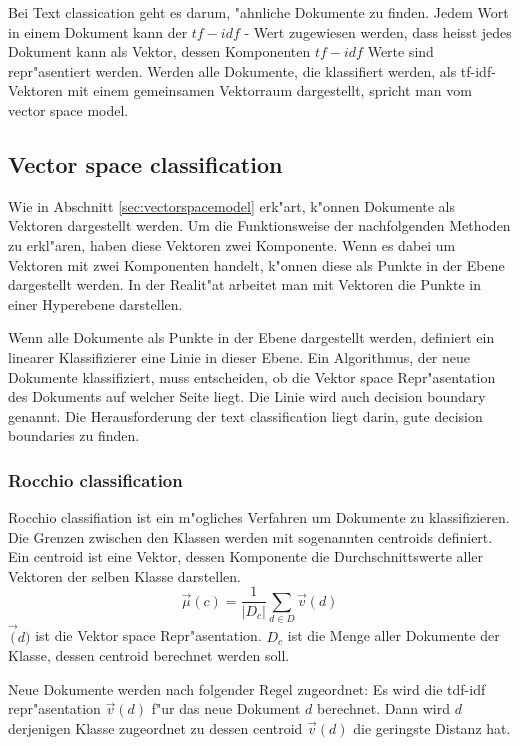 \documentclass[12pt,a4paper,twoside]{article}
\begin{document}
Bei Text classication geht es darum, "ahnliche Dokumente zu finden. Jedem Wort in einem Dokument kann der $tf-idf$ - Wert zugewiesen werden, dass heisst jedes Dokument kann als Vektor, dessen Komponenten $tf-idf$ Werte sind repr"asentiert werden. Werden alle Dokumente, die klassifiert werden, als tf-idf-Vektoren mit einem gemeinsamen Vektorraum dargestellt, spricht man vom vector space model.

\subsection{Vector space classification}
\label{sec:vectorclassification}

Wie in Abschnitt \ref{sec:vectorspacemodel} erk"art, k"onnen Dokumente als Vektoren dargestellt werden. Um die Funktionsweise der nachfolgenden Methoden zu erkl"aren, haben diese Vektoren zwei Komponente. Wenn es dabei um Vektoren mit zwei Komponenten handelt, k"onnen diese als Punkte in der Ebene dargestellt werden. In der Realit"at arbeitet man mit Vektoren die Punkte in einer Hyperebene darstellen.

Wenn alle Dokumente als Punkte in der Ebene dargestellt werden, de\-finiert ein linearer Klassifizierer eine Linie in dieser Ebene. Ein Algorithmus, der neue Dokumente klassifiziert, muss entscheiden, ob die Vektor space Repr"a\-sentation des Dokuments auf welcher Seite liegt. Die Linie wird auch decision boundary genannt. Die Herausforderung der text classification liegt darin, gute decision boundaries zu finden.


\subsubsection{Rocchio classification}
\label{sec:rocchio}

Rocchio classifiation ist ein m"ogliches Verfahren um Dokumente zu klassifizieren. Die Grenzen zwischen den Klassen werden mit sogenannten centroids definiert. Ein centroid ist eine Vektor, dessen Komponente die Durchschnitts\-werte aller Vektoren der selben Klasse darstellen.
\[
\vec \mu(c) = \frac{1}{|D_c|} \sum_{d \in D} \vec v (d)
\]
$\vec (d)$ ist die Vektor space Repr"asentation. $D_c$ ist die Menge aller Dokumente der Klasse, dessen centroid berechnet werden soll.

Neue Dokumente werden nach folgender Regel zugeordnet: Es wird die tdf-idf repr"asentation $\vec v (d)$ f"ur das neue Dokument $d$ berechnet. Dann wird $d$ derjenigen Klasse zugeordnet zu dessen centroid $\vec v (d)$ die geringste Distanz hat.
\end{document}
